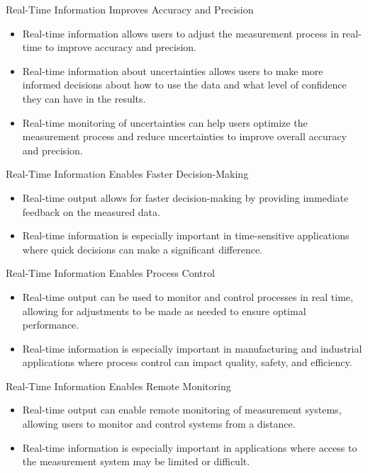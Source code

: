 \begin{frame}{Real-Time Information Improves Accuracy and Precision}

\begin{itemize}
\item Real-time information allows users to adjust the measurement process in real-time to improve accuracy and precision.
\item Real-time information about uncertainties allows users to make more informed decisions about how to use the data and what level of confidence they can have in the results.
\item Real-time monitoring of uncertainties can help users optimize the measurement process and reduce uncertainties to improve overall accuracy and precision.
\end{itemize}

\end{frame}

\begin{frame}{Real-Time Information Enables Faster Decision-Making}

\begin{itemize}
\item Real-time output allows for faster decision-making by providing immediate feedback on the measured data.
\item Real-time information is especially important in time-sensitive applications where quick decisions can make a significant difference.
\end{itemize}

\end{frame}

\begin{frame}{Real-Time Information Enables Process Control}

\begin{itemize}
\item Real-time output can be used to monitor and control processes in real time, allowing for adjustments to be made as needed to ensure optimal performance.
\item Real-time information is especially important in manufacturing and industrial applications where process control can impact quality, safety, and efficiency.
\end{itemize}

\end{frame}

\begin{frame}{Real-Time Information Enables Remote Monitoring}

\begin{itemize}
\item Real-time output can enable remote monitoring of measurement systems, allowing users to monitor and control systems from a distance.
\item Real-time information is especially important in applications where access to the measurement system may be limited or difficult.
\end{itemize}

\end{frame}

